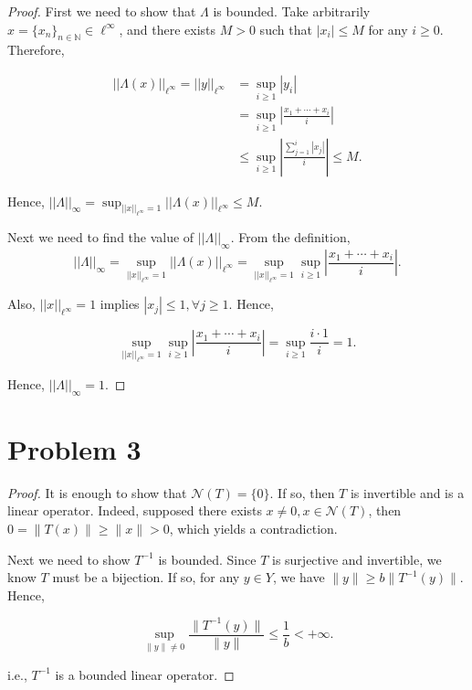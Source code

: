 \documentclass[12pt]{article}
\begin{document}
\begin{proof}

First we need to show that $\Lambda$ is bounded. Take arbitrarily $x = \{ x_n \}_{n\in\mathbb N}\in\ell^\infty$, and there exists $M>0$ such that $|x_i| \leqslant M$ for any $i \geqslant 0$. Therefore, 

$$
\begin{aligned}
||\Lambda(x)||_{\ell^\infty} = ||y||_{\ell^\infty} & = \sup_{i\geqslant 1} |y_i| \\
& = \sup_{i\geqslant 1} \left|\frac{x_1 + \cdots + x_i}{i}\right| \\
& \leqslant \sup_{i\geqslant 1} \left|\frac{\sum_{j=1}^i|x_j|}{i}\right| \leqslant M.
\end{aligned}
$$ 

Hence, $||\Lambda||_\infty = \sup_{||x||_{\ell^\infty} = 1} ||\Lambda(x)||_{\ell^\infty} \leqslant M$.

Next we need to find the value of $||\Lambda||_\infty$. From the definition, 
$$
||\Lambda||_\infty = \sup_{||x||_{\ell^\infty} = 1} ||\Lambda(x)||_{\ell^\infty} = \sup_{||x||_{\ell^\infty} = 1}\sup_{i\geqslant 1}\left| \frac{x_1 + \cdots + x_i}{i} \right|.
$$

Also, $||x||_{\ell^\infty} = 1$ implies $|x_j| \leqslant 1, \forall j\geqslant 1$. Hence, 

$$
\sup_{||x||_{\ell^\infty} = 1}\sup_{i\geqslant 1}\left| \frac{x_1 + \cdots + x_i}{i} \right| = \sup_{i\geqslant 1} \frac{i\cdot 1}{i} = 1.
$$

Hence, $||\Lambda||_\infty = 1$.

\end{proof}

\section*{Problem 3}

\begin{proof}

It is enough to show that $\mathcal N(T) = \{0\}$. If so, then $T$ is invertible and is a linear operator. Indeed, supposed there exists $x\neq 0, x\in \mathcal N(T)$, then $0 = \|T(x)\| \geqslant \|x\| >0$, which yields a contradiction.

Next we need to show $T^{-1}$ is bounded. Since $T$ is surjective and invertible, we know $T$ must be a bijection. If so, for any $y\in Y$, we have $\|y\|\geqslant b\|T^{-1}(y)\|$. Hence, 

$$
\sup_{\|y\|\neq 0} \frac{\|T^{-1}(y)\|}{\|y\|} \leqslant \frac{1}{b} < +\infty.
$$

i.e., $T^{-1}$ is a bounded linear operator.

\end{proof}
\end{document}
